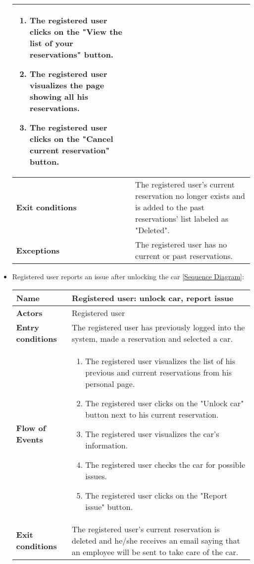 \begin{itemize}
\begin{table}[H]
\begin{tabular}{| m{3.5cm} | m{9.5cm} |}
\begin{enumerate}
			\item The registered user clicks on the "View the list of your reservations" button.
			\item The registered user visualizes the page showing all his reservations.
			\item The registered user clicks on the "Cancel current reservation" button.
		\end{enumerate} \\
		\hline
		\textbf{Exit conditions} & The registered user's current reservation no longer exists and is added to the past reservations' list labeled as "Deleted".\\
		\hline
		\textbf{Exceptions} & The registered user has no current or past reservations.\\
		\hline
	\end{tabular}
\end{table}
\newpage
\item Registered user reports an issue after unlocking the car [\hyperlink{ReportIssue}{Sequence Diagram}]:
\begin{table}[H]
	\centering
	\begin{tabular}{| m{3.5cm} | m{9.5cm} |}
		\hline
		\textbf{Name} & Registered user: unlock car, report issue\\
		\hline
		\textbf{Actors} & Registered user\\
		\hline
		\textbf{Entry conditions} & The registered user has previously logged into the system, made a reservation and selected a car.\\
		\hline
		\textbf{Flow of Events} & 
		\begin{enumerate}
			\item The registered user visualizes the list of his previous and current reservations from his personal page.
			\item The registered user clicks on the "Unlock car" button next to his current reservation.
			\item The registered user visualizes the car's information.
			\item The registered user checks the car for possible issues.
			\item The registered user clicks on the "Report issue" button.   
		\end{enumerate} \\
		\hline
		\textbf{Exit conditions} & The registered user's current reservation is deleted and he/she receives an email saying that an employee will be sent to take care of the car.\\

\end{tabular}
\end{table}
\end{itemize}
